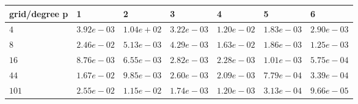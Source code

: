 \begin{tabular}{lllllll}
\hline
 grid/degree p   & 1          & 2          & 3          & 4          & 5          & 6          \\
\hline
 $4$             & $3.92e-03$ & $1.04e+02$ & $3.22e-03$ & $1.20e-02$ & $1.83e-03$ & $2.90e-03$ \\
 $8$             & $2.46e-02$ & $5.13e-03$ & $4.29e-03$ & $1.63e-02$ & $1.86e-03$ & $1.25e-03$ \\
 $16$            & $8.76e-03$ & $6.55e-03$ & $2.82e-03$ & $2.28e-03$ & $1.01e-03$ & $5.75e-04$ \\
 $44$            & $1.67e-02$ & $9.85e-03$ & $2.60e-03$ & $2.09e-03$ & $7.79e-04$ & $3.39e-04$ \\
 $101$           & $2.55e-02$ & $1.15e-02$ & $1.74e-03$ & $1.20e-03$ & $3.13e-04$ & $9.66e-05$ \\
\hline
\end{tabular}